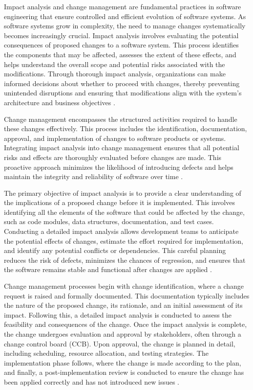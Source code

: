\begin{refsection}
Impact analysis and change management are fundamental practices in software engineering that ensure controlled and efficient evolution of software systems. As software systems grow in complexity, the need to manage changes systematically becomes increasingly crucial. Impact analysis involves evaluating the potential consequences of proposed changes to a software system. This process identifies the components that may be affected, assesses the extent of these effects, and helps understand the overall scope and potential risks associated with the modifications. Through thorough impact analysis, organizations can make informed decisions about whether to proceed with changes, thereby preventing unintended disruptions and ensuring that modifications align with the system's architecture and business objectives \cite[pp.~154-156]{pressman2019software}.

Change management encompasses the structured activities required to handle these changes effectively. This process includes the identification, documentation, approval, and implementation of changes to software products or systems. Integrating impact analysis into change management ensures that all potential risks and effects are thoroughly evaluated before changes are made. This proactive approach minimizes the likelihood of introducing defects and helps maintain the integrity and reliability of software over time \cite[pp.~174-176]{fairley2012managing}.

The primary objective of impact analysis is to provide a clear understanding of the implications of a proposed change before it is implemented. This involves identifying all the elements of the software that could be affected by the change, such as code modules, data structures, documentation, and test cases. Conducting a detailed impact analysis allows development teams to anticipate the potential effects of changes, estimate the effort required for implementation, and identify any potential conflicts or dependencies. This careful planning reduces the risk of defects, minimizes the chances of regression, and ensures that the software remains stable and functional after changes are applied \cite[pp.~42-44]{arnold1993software}.

Change management processes begin with change identification, where a change request is raised and formally documented. This documentation typically includes the nature of the proposed change, its rationale, and an initial assessment of its impact. Following this, a detailed impact analysis is conducted to assess the feasibility and consequences of the change. Once the impact analysis is complete, the change undergoes evaluation and approval by stakeholders, often through a change control board (CCB). Upon approval, the change is planned in detail, including scheduling, resource allocation, and testing strategies. The implementation phase follows, where the change is made according to the plan, and finally, a post-implementation review is conducted to ensure the change has been applied correctly and has not introduced new issues \cite[pp.~174-176]{fairley2012managing}.


\end{refsection}
